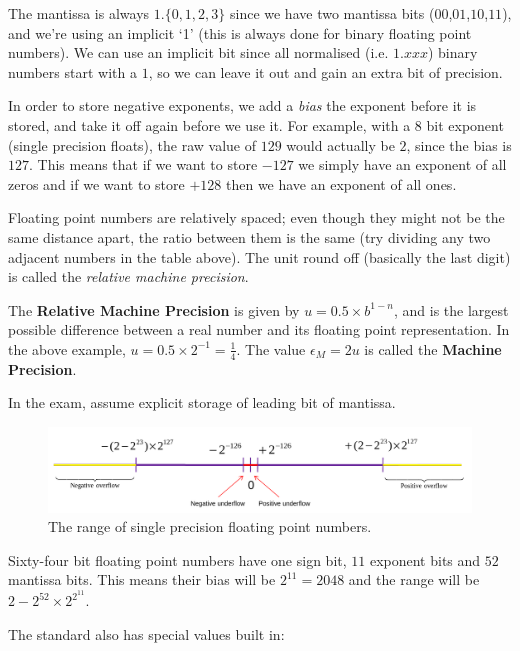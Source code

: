 The mantissa is always $1.\{0,1,2,3\}$ since we have two mantissa bits
($00$,$01$,$10$,$11$), and we're using an implicit `1' (this is always
done for binary floating point numbers). We can use an implicit bit
since all normalised (i.e. $1.xxx$) binary numbers start with a $1$,
so we can leave it out and gain an extra bit of precision.

In order to store negative exponents, we add a \textit{bias} the
exponent before it is stored, and take it off again before we use
it. For example, with a 8 bit exponent (single precision floats), the
raw value of $129$ would actually be $2$, since the bias is
$127$. This means that if we want to store $-127$ we simply have an
exponent of all zeros and if we want to store $+128$ then we have an
exponent of all ones.

Floating point numbers are relatively spaced; even though they might
not be the same distance apart, the ratio between them is the same
(try dividing any two adjacent numbers in the table above). The unit
round off (basically the last digit) is called the \textit{relative
machine precision}.

The \textbf{Relative Machine Precision} is given by $u = 0.5 \times
b^{1 - n}$, and is the largest possible difference between a real
number and its floating point representation. In the above example, $u
= 0.5 \times 2^{-1} = \frac{1}{4}$. The value $\epsilon_M = 2u$ is
called the \textbf{Machine Precision}.

In the exam, assume explicit storage of leading bit of mantissa.

\begin{figure}[h]
  \centering
  \includegraphics[width=\textwidth]{images/fp-range}
  \caption{\label{fig:fp-range} The range of single precision floating
  point numbers.}
\end{figure}

Sixty-four bit floating point numbers have one sign bit, $11$ exponent
bits and $52$ mantissa bits. This means their bias will be $2^{11} =
2048$ and the range will be $2 - 2^{52} \times 2^{2^{11}}$.

The standard also has special values built in:

